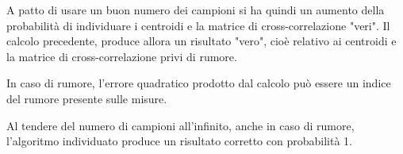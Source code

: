 A patto di usare un buon numero dei campioni si ha quindi un aumento della probabilità di individuare i centroidi e la matrice di cross-correlazione "veri". Il calcolo precedente, produce allora un risultato "vero", cioè relativo ai centroidi e la matrice di cross-correlazione privi di rumore.

In caso di rumore, l'errore quadratico prodotto dal calcolo può essere un indice del rumore presente sulle misure.

Al tendere del numero di campioni all'infinito, anche in caso di rumore, l'algoritmo individuato produce un risultato corretto con probabilità 1.



